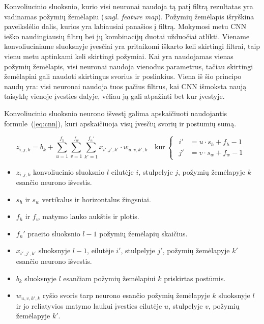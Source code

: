 \documentclass{VUMIFPSbakalaurinis}
\begin{document}
{	Konvoliucinio sluoksnio, kurio visi neuronai naudoja tą patį filtrą rezultatas yra vadinamas požymių žemėlapiu (\textit{angl. feature map}). Požymių žemėlapis išryškina paveikslėlio dalis, kurios yra labiausiai panašios į filtrą. Mokymosi metu CNN ieško naudingiausių filtrų bei jų kombinacijų duotai užduočiai atlikti. Viename konvoliuciniame sluoksnyje įvesčiai yra pritaikomi iškarto keli skirtingi filtrai, taip vienu metu aptinkami keli skirtingi požymiai. Kai yra naudojamas vienas požymių žemėlapis, visi neuronai naudoja vienodus parametrus, tačiau skirtingi žemėlapiai gali naudoti skirtingus svorius ir poslinkius. Viena iš šio principo naudų yra: visi neuronai naudoja tuos pačius filtrus, kai CNN išmoksta naują taisyklę vienoje įvesties dalyje, vėliau ją gali atpažinti bet kur įvestyje. \par
	
	Konvoliucinio sluoksnio neurono išvestį galima apskaičiuoti naudojantis formule~(\ref{eq:cnn}), kuri apskaičiuoja visų įvesčių svorių ir postūmių sumą.
	
	\begin{equation}\label{eq:cnn}
		z_{i, j, k} = b_k + \sum_{u=1}^{f_h} \sum_{v=1}^{f_w} \sum_{k'=1}^{f_n'} x_{i', j', k'} \cdot w_{u,v,k',k}
		\quad \textrm{kur} \
		\begin{cases}
			\begin{aligned}
				i' &= u \cdot s_h + f_h - 1 \\
				j' &= v \cdot s_w + f_w - 1 
			\end{aligned}
		\end{cases} 
	\end{equation}
	
	\begin{itemize}
		\item \(z_{i, j, k}\) konvoliucinio sluoksnio \(l\) eilutėje \(i\), stulpelyje \(j\), požymių žemėlapyje \(k\) esančio neurono išvestis.
		\item \(s_h\) ir \(s_w\) vertikalus ir horizontalus žingsniai.
		\item \(f_h\) ir \(f_w\) matymo lauko aukštis ir plotis.
		\item \(f_n'\) praeito sluoksnio \(l-1\) požymių žemėlapių skaičius.
		\item \(x_{i', j', k'}\) sluoksnyje \(l-1\), eilutėje \(i'\), stulpelyje \(j'\), požymių žemėlapyje \(k'\) esančio neurono išvestis.
		\item \(b_k\) sluoksnyje \(l\) esančiam požymių žemėlapiui \(k\) priskirtas postūmis.
		\item \(w_{u,v,k',k}\) ryšio svoris tarp neurono esančio požymių žemėlapyje \(k\) sluoksnyje \(l\) ir jo reliatyvios matymo laukui įvesties eilutėje \(u\), stulpelyje \(v\), požymių žemėlapyje \(k'\).
	\end{itemize}
}	
\end{document}
